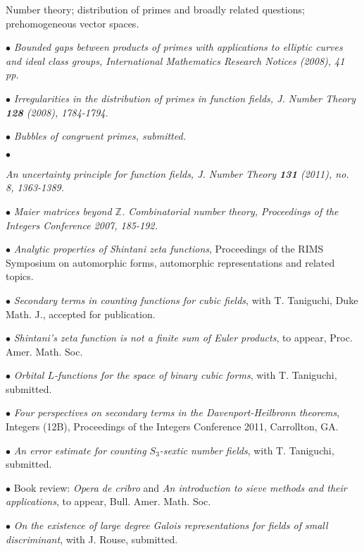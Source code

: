 \documentclass{article}
\newcommand{\categorywidth}{1in}        %
\newcommand{\infowidth}{5.8in}          %
\newcommand{\categorysep}{5pt}
\newcommand{\catlistlabel}[1]%
{\raisebox{0pt}[1ex][0pt]{\makebox[\labelwidth][l]%
    {\parbox[t]{\labelwidth}{\hspace{0pt}\textbf{#1}}}}}
\newenvironment{categories}{\begin{list}{}{
      \setlength{\labelwidth}{\categorywidth}
      \setlength{\leftmargin}{\labelwidth}
      \addtolength{\leftmargin}{\labelsep}
      \setlength{\topsep}{20pt}
      \setlength{\itemsep}{\categorysep}
      \renewcommand{\makelabel}{\catlistlabel}
      }}{\end{list}}
\newcommand{\category}[1]{\item[#1]}
\newcommand{\rawentry}[1]{{\begin{minipage}[t]{\infowidth}{#1}
    \end{minipage}}}
\begin{document}
\begin{flushleft}
\begin{categories}
  \rawentry{Number theory; distribution of primes and broadly related questions;
  prehomogeneous vector spaces. \\}





  \category{Research \\ Publications}

  $\bullet$ {\itshape Bounded gaps between products of primes with applications
to elliptic curves and ideal class groups\upshape, International Mathematics
Research Notices (2008), 41 pp.}

  $\bullet$ {\itshape Irregularities in the distribution of primes in function fields\upshape, 
   J. Number Theory \textbf{128} (2008), 1784-1794.}

  $\bullet$ {\itshape Bubbles of congruent primes\upshape, submitted.}

  $\bullet$ {\itshape An uncertainty principle for function fields\upshape,
J. Number Theory \textbf{131} (2011), no. 8, 1363-1389. 

  $\bullet$ {\itshape Maier matrices beyond $\mathbb{Z}$\upshape.
Combinatorial number theory, 
Proceedings of the Integers Conference 2007, 185-192.}

  $\bullet$ {\itshape Analytic properties of Shintani zeta functions}, Proceedings
of the RIMS Symposium on automorphic forms, automorphic representations and related topics.

  $\bullet$ {\itshape Secondary terms in counting functions for cubic fields}, with T. Taniguchi, Duke Math. J., accepted for publication.

  $\bullet$ {\itshape Shintani's zeta function is not a finite sum of Euler products}, to appear,
Proc. Amer. Math. Soc.

  $\bullet$ {\itshape Orbital $L$-functions for the space of binary cubic forms}, with T. Taniguchi, submitted.

  $\bullet$ {\itshape Four perspectives on secondary terms in the Davenport-Heilbronn theorems}, Integers (12B),
Proceedings of the Integers Conference 2011, Carrollton, GA.

  $\bullet$ {\itshape An error estimate for counting $S_3$-sextic number fields}, with T. Taniguchi, submitted.

  $\bullet$ Book review: {\itshape Opera de cribro} and {\itshape
  An introduction to sieve methods and their applications}, to appear,
  Bull. Amer. Math. Soc.

  $\bullet$ {\itshape On the existence of large degree Galois representations for fields of small
discriminant}, with J. Rouse, submitted.

}
\end{categories}
\end{flushleft}
\end{document}
